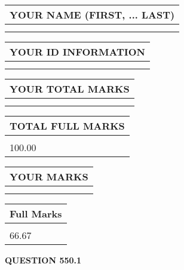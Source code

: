 \documentclass{ctexart}
\begin{document}
   
   
   
\newpage 
\setcounter{page}{ 
   550001 } 
   
   
   
   
\noindent\begin{tabular}{|l|}
\hline
YOUR NAME (FIRST, ... LAST)  \\
\hline
 \\ 
 \\ 
\hline
\end{tabular}
\hspace{0.05in} \begin{tabular}{|l|}
\hline
 YOUR   ID   INFORMATION  \\
\hline
 \\ 
 \\ 
\hline
\end{tabular}
   
   
\vspace{0.2in}\noindent\begin{tabular}{|l|}
\hline
YOUR TOTAL MARKS  \\
\hline
 \\ 
 \\ 
\hline
\end{tabular}
\hspace{0.05in} \begin{tabular}{|l|}
\hline
TOTAL FULL MARKS  \\
\hline
 \\ 
100.00 \\
\hline
\end{tabular}
   
   
 \vspace{0.2in}
 
 
 
 
   
   
  
\vspace{0.2in}
  
\noindent\begin{tabular}{|l|}
\hline
 YOUR MARKS  \\
\hline
 \\ 
 \\ 
\hline
\end{tabular}
\hspace{0.05in} \begin{tabular}{|l|}
\hline
 Full Marks  \\
\hline
 \\ 
66.67 \\
\hline
\end{tabular}
{\textbf{\Large{QUESTION
550.1 
}}}
  
\end{document}
